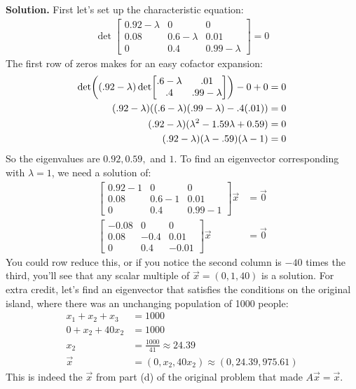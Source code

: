 \documentclass[11pt, letterpaper]{report}
\newenvironment{book}{}{}
\let\originalleft\left
\let\originalright\right
\renewcommand{\left}{\mathopen{}\mathclose\bgroup\originalleft}
\renewcommand{\right}{\aftergroup\egroup\originalright}
\begin{document}
\begin{book}
\textbf{Solution.} First let's set up the characteristic equation:
\begin{align*}
\det \begin{bmatrix}
0.92 - \lambda & 0 & 0 \\
0.08 & 0.6 - \lambda & 0.01 \\
0 & 0.4 & 0.99 - \lambda
\end{bmatrix} = 0
\end{align*}
The first row of zeros makes for an easy cofactor expansion:
\begin{align*}
\det \left( (.92-\lambda)\det \begin{bmatrix}
.6-\lambda & .01 \\
.4 & .99-\lambda
\end{bmatrix}\right)-0+0 &= 0 \\
(.92-\lambda)( (.6-\lambda)(.99-\lambda) -.4(.01) ) &= 0 \\
(.92-\lambda)( \lambda^2-1.59\lambda + 0.59 ) &= 0 \\
(.92-\lambda)(\lambda-.59)(\lambda-1) &= 0 
\end{align*}
So the eigenvalues are $0.92, 0.59,$ and $1$. To find an eigenvector corresponding with $\lambda=1$, we need a solution of:
\begin{align*}
\begin{bmatrix}
0.92 - 1 & 0 & 0 \\
0.08 & 0.6 - 1 & 0.01 \\
0 & 0.4 & 0.99 - 1
\end{bmatrix}\vec{x} &= \vec{0} \\
\begin{bmatrix}
-0.08 & 0 & 0 \\
0.08 & -0.4 & 0.01 \\
0 & 0.4 & -0.01
\end{bmatrix}\vec{x} &= \vec{0} 
\end{align*}
You could row reduce this, or if you notice the second column is $-40$ times the third, you'll see that any scalar multiple of $\vec{x}=(0,1,40)$ is a solution. For extra credit, let's find an eigenvector that satisfies the conditions on the original island, where there was an unchanging population of 1000 people:
\begin{align*}
x_{1} + x_2+ x_3 &= 1000 \\
0 + x_2 + 40x_2 &= 1000 \\
x_2 &= \frac{1000}{41} \approx 24.39 \\
\vec{x}&= (0,x_2,40x_2) \approx (0,24.39,975.61)
\end{align*}
This is indeed the $\vec{x}$ from part (d) of the original problem that made $A\vec{x}=\vec{x}$. \blacksquare
\end{book}
\end{document}

